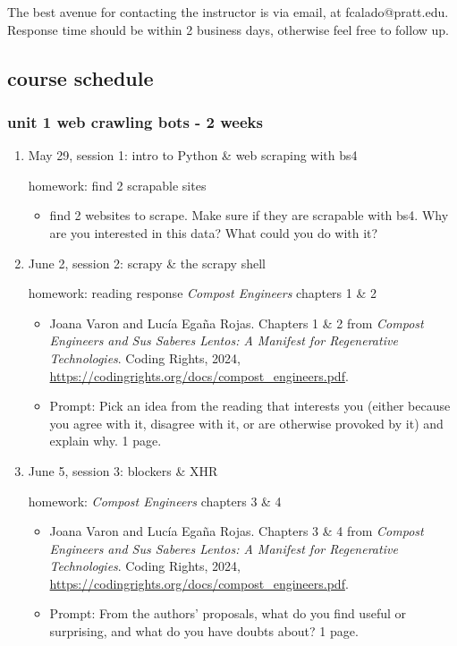 \documentclass[11pt]{article}
\begin{document}
The best avenue for contacting the instructor is via email, at
fcalado@pratt.edu. Response time should be within 2 business days,
otherwise feel free to follow up. 

\subsection{course schedule}
\label{sec:org1f3d169}
\subsubsection{unit 1 web crawling bots - 2 weeks}
\label{sec:org35f4d70}
\begin{enumerate}
\item May 29, session 1: intro to Python \& web scraping with bs4
\label{sec:org96d8473}

homework: find 2 scrapable sites
\begin{itemize}
\item find 2 websites to scrape. Make sure if they are scrapable with bs4.
Why are you interested in this data? What could you do with it?
\end{itemize}

\item June 2, session 2: scrapy \& the scrapy shell
\label{sec:org5bf504e}

homework: reading response \emph{Compost Engineers} chapters 1 \& 2
\begin{itemize}
\item Joana Varon and Lucía Egaña Rojas. Chapters 1 \& 2 from \emph{Compost
Engineers and Sus Saberes Lentos: A Manifest for Regenerative
Technologies}. Coding Rights, 2024,
\url{https://codingrights.org/docs/compost\_engineers.pdf}.
\item Prompt: Pick an idea from the reading that interests you (either
because you agree with it, disagree with it, or are otherwise
provoked by it) and explain why. 1 page.
\end{itemize}

\item June 5, session 3: blockers \& XHR
\label{sec:orga08632a}

homework: \emph{Compost Engineers} chapters 3 \& 4
\begin{itemize}
\item Joana Varon and Lucía Egaña Rojas. Chapters 3 \& 4 from \emph{Compost
Engineers and Sus Saberes Lentos: A Manifest for Regenerative
Technologies}. Coding Rights, 2024,
\url{https://codingrights.org/docs/compost\_engineers.pdf}.
\item Prompt: From the authors' proposals, what do you find useful or
surprising, and what do you have doubts about? 1 page.
\end{itemize}


\end{enumerate}
\end{document}
